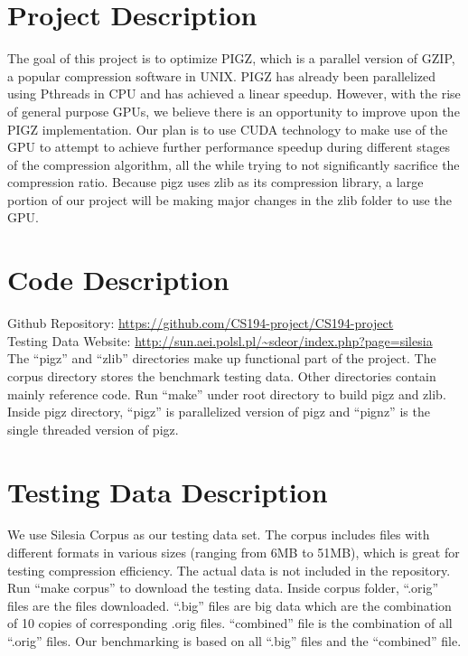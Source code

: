 
\usepackage{amsmath, dsfont, hyperref, xcolor}

\oddsidemargin 0in
\evensidemargin 0in
\textwidth 6.5in
\topmargin -0.5in
\textheight 9.0in
\newcommand{\norm}[1]{\left\lVert #1 \right\rVert}
\newcommand{\?}{\stackrel{?}{=}}

\usepackage{graphicx}



\pagestyle{myheadings}
\section{Project Description}
    The goal of this project is to optimize PIGZ, which is a parallel version of GZIP, a popular compression software in UNIX. PIGZ has already been parallelized using Pthreads in CPU and has achieved a linear speedup. However, with the rise of general purpose GPUs, we believe there is an opportunity to improve upon the PIGZ implementation. Our plan is to use CUDA technology to make use of the GPU to attempt to achieve further performance speedup during different stages of the compression algorithm, all the while trying to not significantly sacrifice the compression ratio. Because pigz uses zlib as its compression library, a large portion of our project will be making major changes in the zlib folder to use the GPU.

\section{Code Description}
Github Repository: \url{https://github.com/CS194-project/CS194-project}\\
Testing Data Website: \url{http://sun.aei.polsl.pl/~sdeor/index.php?page=silesia}\\

The ``pigz'' and ``zlib'' directories make up functional part of the project. The corpus directory stores the benchmark testing data. Other directories contain mainly reference code.
Run ``make'' under root directory to build pigz and zlib. Inside pigz directory, ``pigz'' is parallelized version of pigz and ``pignz'' is the single threaded version of pigz. 

\section{Testing Data Description}
We use Silesia Corpus as our testing data set. The corpus includes files with different formats in various sizes (ranging from 6MB to 51MB), which is great for testing compression efficiency. The actual data is not included in the repository. Run “make corpus” to download the testing data. Inside corpus folder, ``.orig'' files are the files downloaded. ``.big'' files are big data which are the combination of 10 copies of corresponding .orig files. ``combined'' file is the combination of all ``.orig'' files. Our benchmarking is based on all ``.big'' files and the ``combined'' file.

